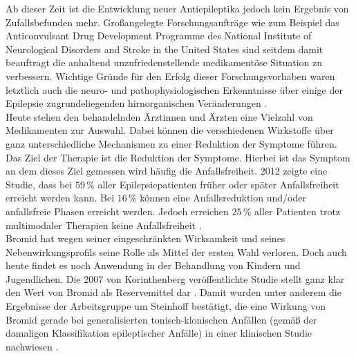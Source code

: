 \documentclass[a4paper,11pt]{report}
\begin{document}
{Ab dieser Zeit ist die Entwicklung neuer Antiepileptika jedoch kein Ergebnis von Zufallsbefunden mehr. Großangelegte Forschungsaufträge wie zum Beispiel das Anticonvulsant Drug Development Programme des National Institute of Neurological Disorders and Stroke in the
United States \cite{Kehne.2017} sind seitdem damit beauftragt die anhaltend unzufriedenstellende medikamentöse Situation zu verbessern. Wichtige Gründe für den Erfolg dieser Forschungsvorhaben waren letztlich auch die neuro- und pathophysiologischen Erkenntnisse über einige der Epilepsie zugrundeliegenden hirnorganischen Veränderungen \cite{Schneble.2013}.\\
Heute stehen den behandelnden Ärztinnen und Ärzten eine Vielzahl von Medikamenten zur Auswahl. Dabei können die verschiedenen Wirkstoffe über ganz unterschiedliche Mechanismen zu einer Reduktion der Symptome führen. \\
Das Ziel der Therapie ist die Reduktion der Symptome. Hierbei ist das Symptom an dem dieses Ziel gemessen wird häufig die Anfallsfreiheit. 2012 zeigte eine Studie, dass bei $59\,\%$ aller Epilepsiepatienten früher oder später Anfallsfreiheit erreicht werden kann. Bei $16\,\%$ können eine Anfallsreduktion und/oder anfallsfreie Phasen erreicht werden. Jedoch erreichen $25\,\%$ aller Patienten trotz multimodaler Therapien keine Anfallsfreiheit \cite{Brodie.2012}.\\
Bromid hat wegen seiner eingeschränkten Wirksamkeit und seines Nebenwirkungsprofils seine Rolle als Mittel der ersten Wahl verloren. Doch auch heute findet es noch Anwendung in der Behandlung von Kindern und Jugendlichen. Die 2007 von Korinthenberg veröffentlichte Studie stellt ganz klar den Wert von Bromid als Reservemittel dar \cite{Korinthenberg.2007}. Damit wurden unter anderem die Ergebnisse der Arbeitsgruppe um Steinhoff bestätigt, die eine Wirkung von Bromid gerade bei generalisierten tonisch-klonischen Anfällen (gemäß der damaligen Klassifikation epileptischer Anfälle) in einer klinischen Studie nachwiesen \cite{Steinhoff.1992b}.\\
}
\end{document}
